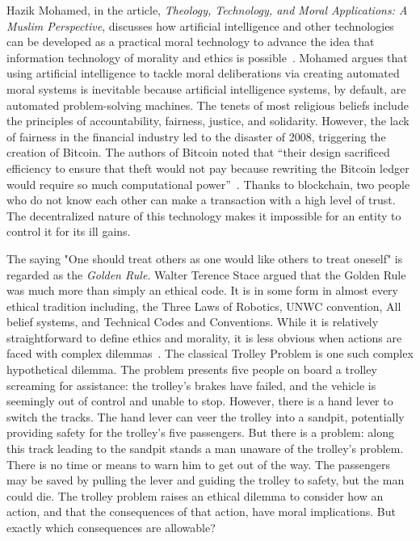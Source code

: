Hazik Mohamed, in the article, \textit{Theology, Technology, and Moral Applications: A Muslim Perspective}, discusses how artificial intelligence and other technologies can be developed as a practical moral technology to advance the idea that information technology of morality and ethics is possible~\cite{260105620200101}. Mohamed argues that using artificial intelligence to tackle moral deliberations via creating automated moral systems is inevitable because artificial intelligence systems, by default, are automated problem-solving machines. The tenets of most religious beliefs include the principles of accountability, fairness, justice, and solidarity. However, the lack of fairness in the financial industry led to the disaster of 2008, triggering the creation of Bitcoin. The authors of Bitcoin noted that “their design sacrificed efficiency to ensure that theft would not pay because rewriting the Bitcoin ledger would require so much computational power”~\cite{260105620200101}. Thanks to blockchain, two people who do not know each other can make a transaction with a high level of trust. The decentralized nature of this technology makes it impossible for an entity to control it for its ill gains.

The saying "One should treat others as one would like others to treat oneself" is regarded as the \textit{Golden Rule}. Walter Terence Stace argued that the Golden Rule was much more than simply an ethical code. It is in some form in almost every ethical tradition including, the Three Laws of Robotics, UNWC convention, All belief systems, and Technical Codes and Conventions. While it is relatively straightforward to define ethics and morality, it is less obvious when actions are faced with complex dilemmas~\cite{260105620200101}. The classical Trolley Problem is one such complex hypothetical dilemma. The problem presents five people on board a trolley screaming for assistance: the trolley’s brakes have failed, and the vehicle is seemingly out of control and unable to stop. However, there is a hand lever to switch the tracks. The hand lever can veer the trolley into a sandpit, potentially providing safety for the trolley’s five passengers. But there is a problem: along this track leading to the sandpit stands a man unaware of the trolley’s problem. There is no time or means to warn him to get out of the way. The passengers may be saved by pulling the lever and guiding the trolley to safety, but the man could die. The trolley problem raises an ethical dilemma to consider how an action, and that the consequences of that action, have moral implications. But exactly which consequences are allowable?~\cite{260105620200101}

